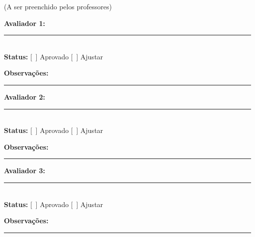 \documentclass[12pt,a4paper]{article}
\begin{document}
(A ser preenchido pelos professores)
 
\vspace{0.5cm}
\noindent\textbf{Avaliador 1:} \rule{7cm}{0.4pt} \\
\textbf{Status:} [\ ] Aprovado \hspace{1cm} [\ ] Ajustar
 
\vspace{0.3cm}
\noindent\textbf{Observações:}
 
\vspace{1.8cm}
\noindent\rule{\textwidth}{0.4pt}
 
\vspace{0.5cm}
\noindent\textbf{Avaliador 2:} \rule{7cm}{0.4pt} \\
\textbf{Status:} [\ ] Aprovado \hspace{1cm} [\ ] Ajustar
 
\vspace{0.3cm}
\noindent\textbf{Observações:}
 
\vspace{1.8cm}
\noindent\rule{\textwidth}{0.4pt}
 
\vspace{0.5cm}
\noindent\textbf{Avaliador 3:} \rule{7cm}{0.4pt} \\
\textbf{Status:} [\ ] Aprovado \hspace{1cm} [\ ] Ajustar
 
\vspace{0.3cm}
\noindent\textbf{Observações:}
 
\vspace{1.8cm}
\noindent\rule{\textwidth}{0.4pt}
\end{document}
